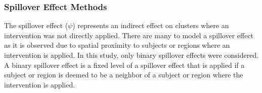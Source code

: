 \documentclass{article}[11pt]
\providecommand{\DIFdelbegin}{} %
\providecommand{\DIFdelend}{} %
\providecommand{\DIFscaledelfig}{0.5}
\newlength{\DIFdelgraphicswidth} %
\newlength{\DIFdelgraphicsheight} %
\providecommand{\DIFdelincludegraphics}[2][]{%
\sbox{\DIFdelgraphicsbox}{\DIFOincludegraphics[#1]{#2}}%
\settoboxwidth{\DIFdelgraphicswidth}{\DIFdelgraphicsbox} %
\settoboxtotalheight{\DIFdelgraphicsheight}{\DIFdelgraphicsbox} %
\scalebox{\DIFscaledelfig}{%
\parbox[b]{\DIFdelgraphicswidth}{\usebox{\DIFdelgraphicsbox}\\[-\baselineskip] \rule{\DIFdelgraphicswidth}{0em}}\llap{\resizebox{\DIFdelgraphicswidth}{\DIFdelgraphicsheight}{%
\setlength{\unitlength}{\DIFdelgraphicswidth}%
\begin{picture}(1,1)%
\thicklines\linethickness{2pt} %
{\color[rgb]{1,0,0}\put(0,0){\framebox(1,1){}}}%
{\color[rgb]{1,0,0}\put(0,0){\line( 1,1){1}}}%
{\color[rgb]{1,0,0}\put(0,1){\line(1,-1){1}}}%
\end{picture}%
}\hspace*{3pt}}} %
} %
\DeclareRobustCommand{\DIFdelbegin}{\DIFOdelbegin \let\includegraphics\DIFdelincludegraphics} %
\DeclareRobustCommand{\DIFdelend}{\DIFOaddend \let\includegraphics\DIFOincludegraphics} %
\begin{document}
\DIFdelend \subsubsection{Spillover Effect Methods}\label{Section:SpilloverEffectMethods}

The spillover effect ($\psi$) represents an indirect effect on clusters where an intervention was not directly applied\cite{benjamin-chung_spillover_2017}\cite{benjamin-chung_extension_2024}. There are many to model a spillover effect as it is observed due to spatial proximity to subjects or regions where an intervention is applied. In this study, only binary spillover effects were considered. A binary spillover effect is a fixed level of a spillover effect that is applied if a subject or region is deemed to be a neighbor of a subject or region where the intervention is applied. 

\DIFdelbegin %


\end{document}
